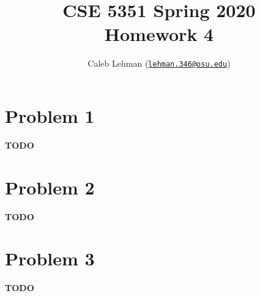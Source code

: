 \documentclass[12pt]{article}
\title{%
CSE 5351 Spring 2020\\
Homework 4
}
\author{%
Caleb Lehman
(\href{mailto:lehman.346@osu.edu}{\texttt{lehman.346@osu.edu}})
}
\date{%
}
\numberwithin{equation}{section}
\theoremstyle{plain}
\begin{document}
\maketitle

\section*{Problem 1}

\textbf{TODO}

\section*{Problem 2}

\textbf{TODO}

\section*{Problem 3}

\textbf{TODO}
\end{document}
